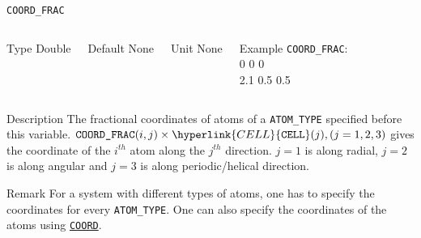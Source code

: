 \begin{frame}[allowframebreaks]{\texttt{{COORD\_FRAC}}} \label{COORD_FRAC}
\vspace*{-12pt}
\begin{columns}
\begin{block}{Type}
Double
\end{block}

\begin{block}{Default}
None
\end{block}

\begin{block}{Unit}
None
\end{block}

\begin{block}{Example}
\texttt{COORD\_FRAC}: \\
0 0 0 \\
2.1 0.5 0.5
\end{block}
\end{columns}

\begin{block}{Description}
The fractional coordinates of atoms of a \texttt{ATOM\_TYPE} specified before this variable. $\texttt{{COORD\_FRAC}}(i , j) \times \hyperlink{CELL}{\texttt{CELL}}(j), (j = 1, 2, 3)$ gives the coordinate of the $i^{th}$ atom along the $j^{th}$ direction. $j = 1$ is along radial, $j = 2$ is along angular and $j = 3$ is along periodic/helical direction.
\end{block}

\begin{block}{Remark}
For a system with different types of atoms, one has to specify the coordinates for every \texttt{ATOM\_TYPE}. One can also specify the coordinates of the atoms using \hyperlink{COORD}{\texttt{COORD}}.
\end{block}
\end{frame}

